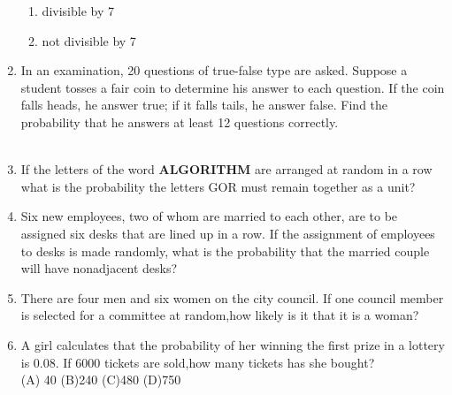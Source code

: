 \begin{enumerate}[label=\thesection.\arabic*,ref=\thesection.\theenumi]
\begin{enumerate}
 		\item divisible by 7
   		\item not divisible by 7
     	\end{enumerate}
\solution

\item In an examination, 20 questions of true-false type are asked. Suppose a student tosses a fair coin to determine his answer to each question. If the coin falls heads, he answer true; if it falls tails, he answer false. Find the probability that he answers at least 12 questions correctly.\\
\\
\solution

\item If the letters of the word \textbf{ALGORITHM} are arranged at random in a row what
is the probability the letters GOR must remain together as a unit?\\
\solution

\item Six new employees, two of whom are married to each other, are to be assigned six desks that
are lined up in a row. If the assignment of employees to desks is made randomly, what is the
probability that the married couple will have nonadjacent desks?\\
\solution

\item There are four men and six women on the city council.
If one council member is selected for a committee at random,how likely is it that it is a woman?\\
\solution

\item A girl calculates that the probability of her winning the first prize in a lottery is 0.08. If 6000 tickets are sold,how many tickets has she bought?\\
(A) 40  (B)240  (C)480  (D)750 

    \end{enumerate}
